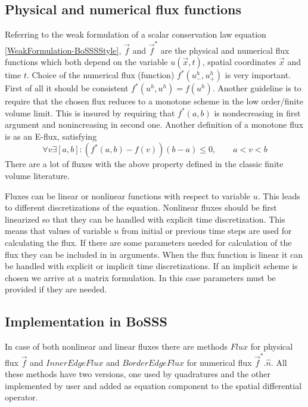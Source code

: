 \documentclass[BoSSSForSolvingConservationLaws.tex]{subfiles}
\begin{document}
\subsection{Physical and numerical flux functions}
Referring to the weak formulation of a scalar conservation law equation \eqref{WeakFormulation-BoSSSStyle}, $\vec{f}$ and $\vec{f}^*$ are the physical and numerical flux functions which both depend on the variable $u(\vec{x},t)$, spatial coordinates $\vec{x}$ and time $t$. Choice of the numerical flux (function) $f^*(u_{-}^h,u_{+}^h)$ is very important. First of all it should be consistent $f^*(u^h,u^h)=f(u^h)$. Another guideline is to require that the chosen flux reduces to a monotone scheme in the low order/finite volume limit. This is insured by requiring that $f^*(a,b)$ is nondecreasing in first argument and nonincreasing in second one. Another definition of a monotone flux is as an E-flux, satisfying\\
\[
\forall v \exists [a,b]: (f^*(a,b)-f(v))(b-a) \leq 0, \qquad a<v<b
\]
There are a lot of fluxes with the above property defined in the classic finite volume literature.\\
\begin{comment}
The Lax-Friedrichs flux is perhaps the simplest numerical flux and often the most efficient flux, but generally not leading to the most accurate scheme. Clearly, it contains as special cases the central flux and the upwind flux for scalar linear problems.
\[
f^{LF}(a,b)=\frac{a+b}{2}+\frac{C}{2} \hat{n}.(a-b)
\]
\end{comment}
Fluxes can be linear or nonlinear functions with respect to variable $u$. This leads to different discretizations of the equation. Nonlinear fluxes should be first linearized so that they can be handled with explicit time discretization. This means that values of variable $u$ from initial or previous time steps are used for calculating the flux. If there are some parameters needed for calculation of the flux they can be included in in arguments. When the flux function is linear it can be handled with explicit or implicit time discretizations. If an implicit scheme is chosen we arrive at a matrix formulation. In this case parameters must be provided if they are needed.

\subsection*{Implementation in BoSSS}
In case of both nonlinear and linear fluxes there are methods $Flux$ for physical flux $\vec{f}$ and $InnerEdgeFlux$ and $BorderEdgeFlux$ for numerical flux $\vec{f}^*.\hat{n}$. All these methods have two versions, one used by quadratures and the other implemented by user and added as equation component to the spatial differential operator.\\
\end{document}
